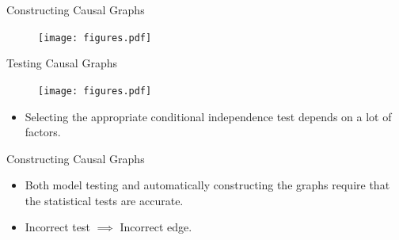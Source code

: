 \documentclass[aspectratio=169]{beamer}
\begin{document}
\begin{frame}{Constructing Causal Graphs}

\vspace{1em}

\begin{figure}
	\texttt{[image: figures.pdf]}
\end{figure}

	
\end{frame}

\begin{frame}{Testing Causal Graphs}
	\begin{figure}
		\texttt{[image: figures.pdf]}
	\end{figure}

	\begin{itemize}
		\item Selecting the appropriate conditional independence test depends on a
	lot of factors.
	\end{itemize}

	\vspace{1em}
		
\end{frame}

\begin{frame}{Constructing Causal Graphs}

	\begin{itemize}
		\item Both model testing and automatically constructing the graphs require that the statistical tests are accurate.
		\item Incorrect test $ \implies $ Incorrect edge.
	\end{itemize}
	
\end{frame}
\end{document}

